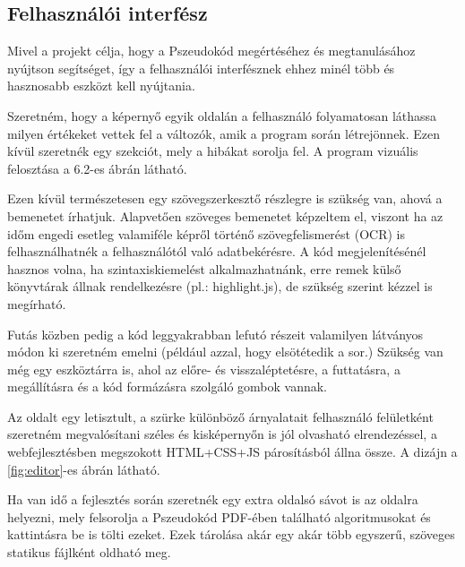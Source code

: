 \subsection{Felhasználói interfész}


Mivel a projekt célja, hogy a Pszeudokód megértéséhez és megtanulásához nyújtson segítséget, így a felhasználói interfésznek ehhez minél több és hasznosabb eszközt kell nyújtania.

Szeretném, hogy a képernyő egyik oldalán a felhasználó folyamatosan láthassa milyen értékeket vettek fel a változók, amik a program során létrejönnek. Ezen kívül szeretnék egy szekciót, mely a hibákat sorolja fel. A program vizuális felosztása a 6.2-es ábrán látható.

Ezen kívül természetesen egy szövegszerkesztő részlegre is szükség van, ahová a bemenetet írhatjuk. Alapvetően szöveges bemenetet képzeltem el, viszont ha az időm engedi esetleg valamiféle képről történő szövegfelismerést (OCR) is felhasználhatnék a felhasználótól való adatbekérésre. A kód megjelenítésénél hasznos volna, ha szintaxiskiemelést alkalmazhatnánk, erre remek külső könyvtárak állnak rendelkezésre (pl.: highlight.js), de szükség szerint kézzel is megírható.

Futás közben pedig a kód leggyakrabban lefutó részeit valamilyen látványos módon ki szeretném emelni (például azzal, hogy elsötétedik a sor.) Szükség van még egy eszköztárra is, ahol az előre- és visszaléptetésre, a futtatásra, a megállításra és a kód formázásra szolgáló gombok vannak.

Az oldalt egy letisztult, a szürke különböző árnyalatait felhasználó felületként szeretném megvalósítani széles és kisképernyőn is jól olvasható elrendezéssel, a webfejlesztésben megszokott HTML+CSS+JS párosításból állna össze. A dizájn a \ref{fig:editor}-es ábrán látható.

Ha van idő a fejlesztés során szeretnék egy extra oldalsó sávot is az oldalra helyezni, mely felsorolja a Pszeudokód PDF-ében található algoritmusokat és kattintásra be is tölti ezeket. Ezek tárolása akár egy akár több egyszerű, szöveges statikus fájlként oldható meg.